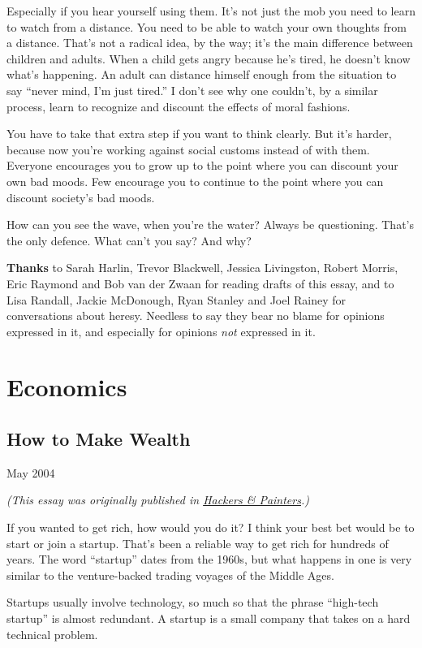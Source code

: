 \documentclass[12pt]{book}
\begin{document}
Especially if you hear yourself using them. It's not just the mob you
need to learn to watch from a distance. You need to be able to watch
your own thoughts from a distance. That's not a radical idea, by the
way; it's the main difference between children and adults. When a child
gets angry because he's tired, he doesn't know what's happening. An
adult can distance himself enough from the situation to say ``never
mind, I'm just tired.'' I don't see why one couldn't, by a similar
process, learn to recognize and discount the effects of moral fashions.

You have to take that extra step if you want to think clearly. But it's
harder, because now you're working against social customs instead of
with them. Everyone encourages you to grow up to the point where you can
discount your own bad moods. Few encourage you to continue to the point
where you can discount society's bad moods.

How can you see the wave, when you're the water? Always be questioning.
That's the only defence. What can't you say? And why?

\textbf{Thanks} to Sarah Harlin, Trevor Blackwell, Jessica Livingston,
Robert Morris, Eric Raymond and Bob van der Zwaan for reading drafts of
this essay, and to Lisa Randall, Jackie McDonough, Ryan Stanley and Joel
Rainey for conversations about heresy. Needless to say they bear no
blame for opinions expressed in it, and especially for opinions
\emph{not} expressed in it.
\part{Economics}
\chapter{How to Make Wealth}

May 2004

\emph{(This essay was originally published in
\href{http://www.amazon.com/gp/product/0596006624/104-0572701-7443937}{Hackers
\& Painters}.)}

If you wanted to get rich, how would you do it? I think your best bet
would be to start or join a startup. That's been a reliable way to get
rich for hundreds of years. The word ``startup'' dates from the 1960s,
but what happens in one is very similar to the venture-backed trading
voyages of the Middle Ages.

Startups usually involve technology, so much so that the phrase
``high-tech startup'' is almost redundant. A startup is a small company
that takes on a hard technical problem.
\end{document}
